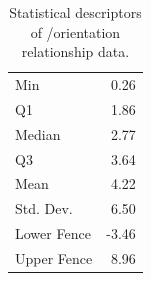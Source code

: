 \begin{table}
	
	\begin{center}
\begin{tabular}{lr}
	
		Min &
		0.26 \\
		
		Q1 &
		1.86 \\
		
		Median &
		2.77 \\
		
		Q3 &
		3.64 \\
		
		Mean &
		4.22 \\
		
		Std. Dev. &
		6.50 \\
		
		Lower Fence &
		-3.46 \\
		
		Upper Fence &
		8.96 \\
		
	\end{tabular}

\end{center}	\caption[Statistical descriptors of orientation relationship
data]{Statistical descriptors of \feo[0001]/\sto[111] orientation relationship data.}
	\label{tab:outofplanestats}


\end{table}

